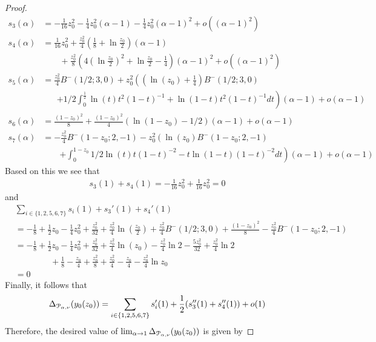 \begin{proof}
\begin{align*}
s_3(\alpha) &= -\frac{1}{16}z_0^2 -\frac{1}{4}z_0^2(\alpha-1)-\frac{1}{4}z_0^2(\alpha-1)^2+o( (\alpha-1)^2) \\
s_4(\alpha) &= \frac{1}{16}z_0^2 +\frac{z_0^2}{4}\left(\frac{1}{8}+\ln\frac{z_0}{2}\right)(\alpha-1)\\
&\qquad+\frac{z_0^2}{8}\left(4\left(\ln\frac{z_0}{2}\right)^2+\ln\frac{z_0}{2} - \frac{1}{4}\right)(\alpha-1)^2+o( (\alpha-1)^2)\\
s_5(\alpha) &= \frac{z_0^2}{4} B^-(1/2;3,0) + z_0^2\left(\left(\ln(z_0)+\frac{1}{4}\right) B^-(1/2;3,0) \right. \\
 	&\hspace{20pt}\left.+1/2\int_0^{\frac{1}{2}} \ln(t)t^2(1-t)^{-1}+\ln(1-t)t^2(1-t)^{-1}dt \right)  (\alpha-1)+o (\alpha-1)\\
s_6(\alpha) &= \frac{(1-z_0)^2}{8}+\frac{(1-z_0)^2}{4} (\ln(1-z_0)-1/2 )(\alpha-1)+o(\alpha-1)\\
s_7(\alpha) &= -\frac{z_0^2}{4}B^-(1-z_0;2,-1) - z_0^2 \left(\ln(z_0)B^-(1-z_0;2,-1) \right. \\
&\qquad \left.+\int_0^{1-z_0} 1/2\ln(t)t(1-t)^{-2}-t\ln(1-t)(1-t)^{-2}dt \right) (\alpha-1)+o(\alpha-1)
\end{align*}
Based on this we see that
\begin{align*}
s_3(1)+s_4(1)=-\frac{1}{16}z_0^2+\frac{1}{16}z_0^2 =0
\end{align*}
and
\begin{align*}
&\sum_{i\in \{1,2,5,6,7\}} s_i(1) + s_3'(1)+s_4'(1) \\
&= -\frac{1}{8}+\frac{1}{2}z_0-\frac{1}{4}z_0^2+\frac{z_0^2}{32}+\frac{z_0^2}{4}\ln(\frac{z_0}{2}) 
+\frac{z_0^2}{4}B^-(1/2;3,0)+\frac{(1-z_0)^2}{8}-\frac{z_0^2}{4}B^-(1-z_0;2,-1) \\
&=-\frac{1}{8}+\frac{1}{2}z_0-\frac{1}{4}z_0^2+\frac{z_0^2}{32}+\frac{z_0^2}{4}\ln(z_0)-\frac{z_0^2}{4}\ln 2 
-\frac{5z_0^2}{32}+\frac{z_0^2}{4}\ln2 \\ 
&\hspace{50pt}+\frac{1}{8}-\frac{z_0}{4}+\frac{z_0^2}{8}+\frac{z_0^2}{4}-\frac{z_0}{4}-\frac{z_0^2}{4}\ln z_0 \\
&=0
\end{align*}
Finally, it follows that
\begin{align*}
\Delta_{{\mathcal P}_{\alpha,\nu}}(y_0(z_0)) = \sum_{i \in\{1,2,5,6,7\}} s_i'(1)+\frac{1}{2}(s_3''(1)+s_4''(1)) + o(1)
\end{align*}
Therefore, the desired value of $\lim_{\alpha \rightarrow 1} \Delta_{{\mathcal P}_{\alpha,\nu}}(y_0(z_0))$ is given by

\end{proof}
